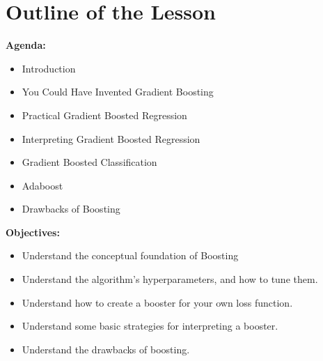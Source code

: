 \section{Outline of the Lesson}
%
\begin{frame}
\textbf{Agenda:}
 
  \begin{itemize}
    \item Introduction
    \item You Could Have Invented Gradient Boosting
    \item Practical Gradient Boosted Regression
    \item Interpreting Gradient Boosted Regression
    \item Gradient Boosted Classification
    \item Adaboost
    \item Drawbacks of Boosting
  \end{itemize}

\end{frame}
%
\begin{frame}
\textbf{Objectives:}

  \begin{itemize}
    \item Understand the conceptual foundation of Boosting
    \item Understand the algorithm's hyperparameters, and how to tune them.
    \item Understand how to create a booster for your own loss function.
    \item Understand some basic strategies for interpreting a booster.
    \item Understand the drawbacks of boosting.
  \end{itemize}
  
\end{frame}